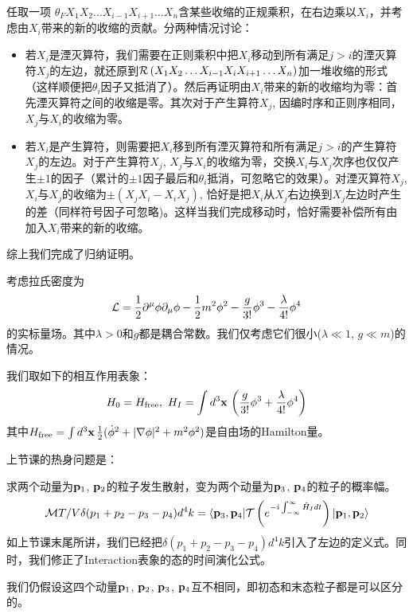 \documentclass[CJK]{beamer}
\begin{document}
\begin{frame}
\bch
{\small
任取一项 $\theta_F X_1X_2\ldots X_{i-1}X_{i+1}\ldots X_n$含某些收缩的正规乘积，在右边乘以$X_i$，并考虑由$X_i$带来的新的收缩的贡献。分两种情况讨论：
\begin{itemize}
\item{若$X_i$是湮灭算符，我们需要在正则乘积中把$X_i$移动到所有满足$j>i$的湮灭算符$X_j$的左边，就还原到$\mathcal{R}\left(X_1X_2\ldots X_{i-1}X_iX_{i+1}\ldots X_n\right)$加一堆收缩的形式（这样顺便把$\theta_i$因子又抵消了）。然后再证明由$X_i$带来的新的收缩均为零：首先湮灭算符之间的收缩是零。其次对于产生算符$X_j$, 因编时序和正则序相同，$X_j$与$X_i$的收缩为零。}
\item{若$X_i$是产生算符，则需要把$X_i$移到所有湮灭算符和所有满足$j>i$的产生算符$X_j$的左边。对于产生算符$X_j$, $X_j$与$X_i$的收缩为零，交换$X_i$与$X_j$次序也仅仅产生$\pm 1$的因子（累计的$\pm 1$因子最后和$\theta_i$抵消，可忽略它的效果）。对湮灭算符$X_j$, $X_i$与$X_j$的收缩为$\pm(X_jX_i - X_iX_j)$, 恰好是把$X_i$从$X_j$右边换到$X_j$左边时产生的差（同样符号因子可忽略)。这样当我们完成移动时，恰好需要补偿所有由加入$X_i$带来的新的收缩。}
\end{itemize}
综上我们完成了归纳证明。
}
\ech
\end{frame}


\begin{frame} 
\bch
考虑拉氏密度为
$${\mathcal{L}} = \frac{1}{2}\partial^\mu\phi\partial_\mu\phi - \frac{1}{2}m^2\phi^2 - \frac{g}{3!}\phi^3- \frac{\lambda}{4!}\phi^4$$
的实标量场。其中$\lambda>0$和$g$都是耦合常数。我们仅考虑它们很小($\lambda \ll 1$, $g\ll m$)的情况。

我们取如下的相互作用表象：
$$ H_0 = H_{\rm free},\ H_I = \int d^3{\mathbf{x}}\, \left(\frac{g}{3!}\phi^3 + \frac{\lambda}{4!} \phi^4\right)$$
其中$H_{\rm free} = \int d^3{\mathbf{x}}\, \frac{1}{2}(\dot\phi^2 + |\nabla \phi|^2 + m^2\phi^2)$是自由场的Hamilton量。

\ech
\end{frame}




\begin{frame} 
\bch
上节课的热身问题是：
\skipline

求两个动量为${\mathbf{p}}_1$, ${\mathbf{p}}_2$的粒子发生散射，变为两个动量为${\mathbf{p}}_3$, ${\mathbf{p}}_4$的粒子的概率幅。
$${\mathcal{M}} T/V \delta(p_1+p_2-p_3-p_4)d^4k= \langle {\mathbf{p}}_3, {\mathbf{p}}_4| \mathcal{T}\left( e^{-{\dot{\imath}}\int_{-\infty}^\infty \hat{H}_I dt}\right)|{\mathbf{p}}_1,{\mathbf{p}}_2\rangle$$
如上节课末尾所讲，我们已经把$\delta(p_1+p_2-p_3-p_4)d^4k$引入了左边的定义式。同时，我们修正了Interaction表象的态的时间演化公式。
\skipline

我们仍假设这四个动量${\mathbf{p}}_1$, ${\mathbf{p}}_2$, ${\mathbf{p}}_3$, ${\mathbf{p}}_4$互不相同，即初态和末态粒子都是可以区分的。
\ech
\end{frame}
\end{document}
